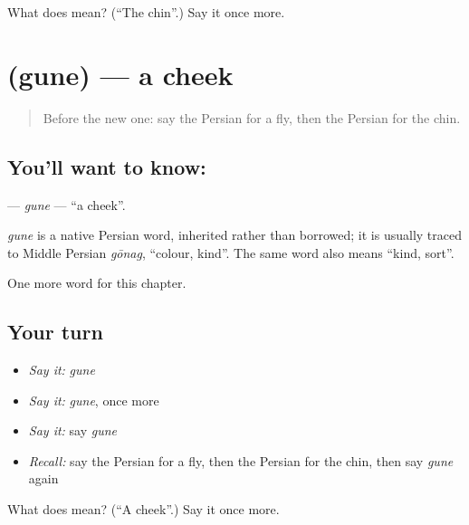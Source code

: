 \begin{tcolorbox}[breakable,colback=teal!4,colframe=teal!35!black,title={Before you move on}]
What does  mean? (\textquotedblleft{}The chin\textquotedblright{}.) Say it once more.
\end{tcolorbox}
\section[\texorpdfstring{\fa{گونه} (gune)}{گونه (gune)}]{ (gune) — a cheek}

\label{lesson:FA-C107-gune}



\begin{quote}
Before the new one: say the Persian for a fly, then the Persian for the chin.
\end{quote}

\subsection*{You'll want to know: }
\textbf{} — \emph{gune} — \textquotedblleft{}a cheek\textquotedblright{}.

\begin{cousinweb}
\emph{gune} is a native Persian word, inherited rather than borrowed; it is usually traced to Middle Persian \emph{gōnag}, \textquotedblleft{}colour, kind\textquotedblright{}. The same word also means \textquotedblleft{}kind, sort\textquotedblright{}.
\end{cousinweb}

\begin{grammarlens}[title={What you've built}]
One more word for this chapter.
\end{grammarlens}

\subsection*{Your turn}
\begin{itemize}
\raggedright
  \item \emph{Say it:} \emph{gune}
  \item \emph{Say it:} \emph{gune}, once more
  \item \emph{Say it:} say \emph{gune}
  \item \emph{Recall:} say the Persian for a fly, then the Persian for the chin, then say \emph{gune} again
\end{itemize}

\begin{tcolorbox}[breakable,colback=teal!4,colframe=teal!35!black,title={Before you move on}]
What does  mean? (\textquotedblleft{}A cheek\textquotedblright{}.) Say it once more.
\end{tcolorbox}
